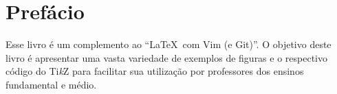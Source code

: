 % 
% 
% 
% 
% 
\chapter*{Prefácio}

Esse livro \'{e} um complemento ao ``\LaTeX \ com Vim (e Git)''. O objetivo deste livro \'{e} apresentar uma vasta variedade de exemplos de figuras e o respectivo c\'{o}digo do Ti\emph{k}Z para facilitar sua utiliza\c{c}\~{a}o por professores dos ensinos fundamental e m\'{e}dio.
